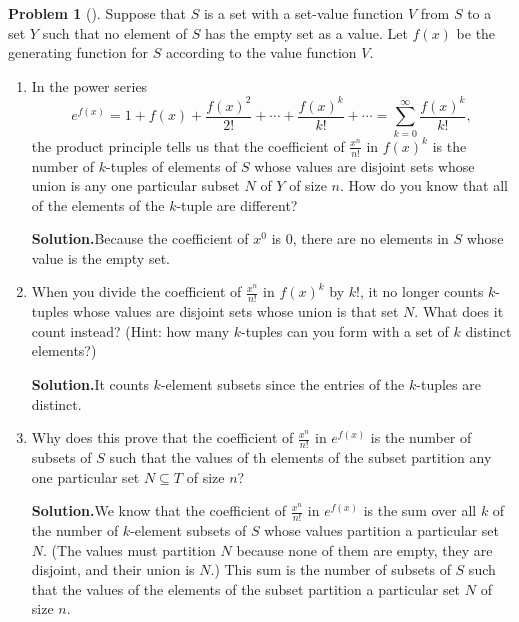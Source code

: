\documentclass[10pt,]{book}
\theoremstyle{plain}
\theoremstyle{definition}
\newtheorem{activity}[project]{Problem}
\theoremstyle{definition}
\numberwithin{equation}{chapter}
\begin{document}
\begin{activity}[]\label{exponentialformula}
Suppose that \(S\) is a set with a set-value function \(V\) from \(S\) to a set \(Y\) such that no element of \(S\) has the empty set as a value. Let \(f(x)\) be the generating function for \(S\) according to the value function \(V\).%
\begin{enumerate}[font=\bfseries,label=(\alph*),ref=\alph*]
\item\label{task-262} In the power series%
\begin{equation*}
e^{f(x)} = 1 + f(x) + \frac{f(x)^2}{2!} +
\cdots + \frac{f(x)^k}{k!} + \cdots= \sum_{k=0}^\infty \frac{f(x)^k}{k!},
\end{equation*}
the product principle tells us that the coefficient of \(\frac{x^n}{n!}\) in \(f(x)^k\) is the number of \(k\)-tuples of elements of \(S\) whose values are disjoint sets whose union is any one particular subset \(N\) of \(Y\) of size \(n\).  How do you know that all of the elements of the \(k\)-tuple are different?%
\par\medskip\noindent%
\textbf{Solution.}\quad Because the coefficient of \(x^0\) is 0, there are no elements in \(S\) whose value is the empty set.%
\item\label{task-263} When you divide the coefficient of \(\frac{x^n}{n!}\) in \(f(x)^k\) by \(k!\), it no longer counts \(k\)-tuples whose values are disjoint sets whose union is that set \(N\).  What does it count instead?  (Hint: how many \(k\)-tuples can you form with a set of \(k\) distinct elements?)%
\par\medskip\noindent%
\textbf{Solution.}\quad It counts \(k\)-element subsets since the entries of the \(k\)-tuples are distinct.%
\item\label{task-264} Why does this prove that the coefficient of \(\frac{x^n}{n!}\) in \(e^{f(x)}\) is the number of subsets of \(S\) such that the values of th elements of the subset partition any one particular set \(N\subseteq T\) of size \(n\)?%
\par\medskip\noindent%
\textbf{Solution.}\quad We know that the coefficient of \(\frac{x^n}{n!}\) in \(e^{f(x)}\) is the sum over all \(k\) of the number of \(k\)-element subsets of \(S\) whose values partition a particular set \(N\). (The values must partition \(N\) because none of them are empty, they are disjoint, and their union is \(N\).) This sum is the number of subsets of \(S\) such that the values of the elements of the subset partition a particular set \(N\) of size \(n\).%
\end{enumerate}
\end{activity}
\end{document}
